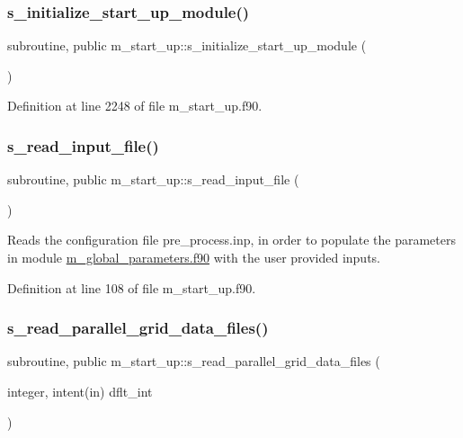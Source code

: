 \subsubsection{\texorpdfstring{s\+\_\+initialize\+\_\+start\+\_\+up\+\_\+module()}{s\_initialize\_start\_up\_module()}}
{\footnotesize\ttfamily subroutine, public m\+\_\+start\+\_\+up\+::s\+\_\+initialize\+\_\+start\+\_\+up\+\_\+module (\begin{DoxyParamCaption}{ }\end{DoxyParamCaption})}



Definition at line 2248 of file m\+\_\+start\+\_\+up.\+f90.

\mbox{\label{namespacem__start__up_ae0571e78c0179c22d3811df31c33c321}} 
\subsubsection{\texorpdfstring{s\+\_\+read\+\_\+input\+\_\+file()}{s\_read\_input\_file()}}
{\footnotesize\ttfamily subroutine, public m\+\_\+start\+\_\+up\+::s\+\_\+read\+\_\+input\+\_\+file (\begin{DoxyParamCaption}{ }\end{DoxyParamCaption})}



Reads the configuration file pre\+\_\+process.\+inp, in order to populate the parameters in module \hyperlink{m__global__parameters_8f90}{m\+\_\+global\+\_\+parameters.\+f90} with the user provided inputs. 



Definition at line 108 of file m\+\_\+start\+\_\+up.\+f90.

\mbox{\label{namespacem__start__up_aaaad3d18eef01d1d8387e34a8b7d33ac}} 
\subsubsection{\texorpdfstring{s\+\_\+read\+\_\+parallel\+\_\+grid\+\_\+data\+\_\+files()}{s\_read\_parallel\_grid\_data\_files()}}
{\footnotesize\ttfamily subroutine, public m\+\_\+start\+\_\+up\+::s\+\_\+read\+\_\+parallel\+\_\+grid\+\_\+data\+\_\+files (\begin{DoxyParamCaption}\item[{integer, intent(in)}]{dflt\+\_\+int }\end{DoxyParamCaption})}



